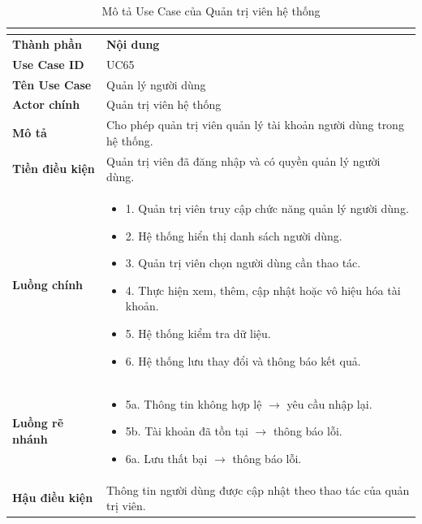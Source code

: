 \begin{longtable}{|C{3cm}|L{11cm}|}
\caption{Mô tả Use Case của Quản trị viên hệ thống}\\
\label{tab:mo-ta-uc-quan-tri-vien-01}\\
\hline
\textbf{Thành phần} & \textbf{Nội dung} \\
\hline
\textbf{Use Case ID} & UC65 \\
\hline
\textbf{Tên Use Case} & Quản lý người dùng \\
\hline
\textbf{Actor chính} & Quản trị viên hệ thống \\
\hline
\textbf{Mô tả} &
Cho phép quản trị viên quản lý tài khoản người dùng trong hệ thống.
\\
\hline
\textbf{Tiền điều kiện} &
Quản trị viên đã đăng nhập và có quyền quản lý người dùng.
\\
\hline
\textbf{Luồng chính} &
\begin{itemize}[leftmargin=*,topsep=2pt,itemsep=2pt]
    \item 1. Quản trị viên truy cập chức năng quản lý người dùng.
    \item 2. Hệ thống hiển thị danh sách người dùng.
    \item 3. Quản trị viên chọn người dùng cần thao tác.
    \item 4. Thực hiện xem, thêm, cập nhật hoặc vô hiệu hóa tài khoản.
    \item 5. Hệ thống kiểm tra dữ liệu.
    \item 6. Hệ thống lưu thay đổi và thông báo kết quả.
\end{itemize}
\\
\hline
\textbf{Luồng rẽ nhánh} &
\begin{itemize}[leftmargin=*,topsep=2pt,itemsep=2pt]
    \item 5a. Thông tin không hợp lệ $\rightarrow$ yêu cầu nhập lại.
    \item 5b. Tài khoản đã tồn tại $\rightarrow$ thông báo lỗi.
    \item 6a. Lưu thất bại $\rightarrow$ thông báo lỗi.
\end{itemize}
\\
\hline
\textbf{Hậu điều kiện} &
Thông tin người dùng được cập nhật theo thao tác của quản trị viên.
\\
\hline
\end{longtable}


